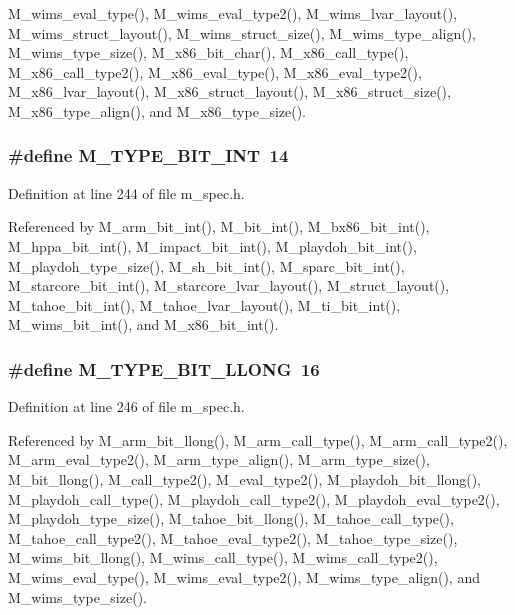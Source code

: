 M\_\-wims\_\-eval\_\-type(), M\_\-wims\_\-eval\_\-type2(), M\_\-wims\_\-lvar\_\-layout(), M\_\-wims\_\-struct\_\-layout(), M\_\-wims\_\-struct\_\-size(), M\_\-wims\_\-type\_\-align(), M\_\-wims\_\-type\_\-size(), M\_\-x86\_\-bit\_\-char(), M\_\-x86\_\-call\_\-type(), M\_\-x86\_\-call\_\-type2(), M\_\-x86\_\-eval\_\-type(), M\_\-x86\_\-eval\_\-type2(), M\_\-x86\_\-lvar\_\-layout(), M\_\-x86\_\-struct\_\-layout(), M\_\-x86\_\-struct\_\-size(), M\_\-x86\_\-type\_\-align(), and M\_\-x86\_\-type\_\-size().
\subsubsection{\setlength{\rightskip}{0pt plus 5cm}\#define M\_\-TYPE\_\-BIT\_\-INT~14}\label{m__spec_8h_432c3e10a97f13f2a41132bfd3a5602b}




Definition at line 244 of file m\_\-spec.h.

Referenced by M\_\-arm\_\-bit\_\-int(), M\_\-bit\_\-int(), M\_\-bx86\_\-bit\_\-int(), M\_\-hppa\_\-bit\_\-int(), M\_\-impact\_\-bit\_\-int(), M\_\-playdoh\_\-bit\_\-int(), M\_\-playdoh\_\-type\_\-size(), M\_\-sh\_\-bit\_\-int(), M\_\-sparc\_\-bit\_\-int(), M\_\-starcore\_\-bit\_\-int(), M\_\-starcore\_\-lvar\_\-layout(), M\_\-struct\_\-layout(), M\_\-tahoe\_\-bit\_\-int(), M\_\-tahoe\_\-lvar\_\-layout(), M\_\-ti\_\-bit\_\-int(), M\_\-wims\_\-bit\_\-int(), and M\_\-x86\_\-bit\_\-int().
\subsubsection{\setlength{\rightskip}{0pt plus 5cm}\#define M\_\-TYPE\_\-BIT\_\-LLONG~16}\label{m__spec_8h_f41d6eb55054b710299905e92f57ad57}




Definition at line 246 of file m\_\-spec.h.

Referenced by M\_\-arm\_\-bit\_\-llong(), M\_\-arm\_\-call\_\-type(), M\_\-arm\_\-call\_\-type2(), M\_\-arm\_\-eval\_\-type2(), M\_\-arm\_\-type\_\-align(), M\_\-arm\_\-type\_\-size(), M\_\-bit\_\-llong(), M\_\-call\_\-type2(), M\_\-eval\_\-type2(), M\_\-playdoh\_\-bit\_\-llong(), M\_\-playdoh\_\-call\_\-type(), M\_\-playdoh\_\-call\_\-type2(), M\_\-playdoh\_\-eval\_\-type2(), M\_\-playdoh\_\-type\_\-size(), M\_\-tahoe\_\-bit\_\-llong(), M\_\-tahoe\_\-call\_\-type(), M\_\-tahoe\_\-call\_\-type2(), M\_\-tahoe\_\-eval\_\-type2(), M\_\-tahoe\_\-type\_\-size(), M\_\-wims\_\-bit\_\-llong(), M\_\-wims\_\-call\_\-type(), M\_\-wims\_\-call\_\-type2(), M\_\-wims\_\-eval\_\-type(), M\_\-wims\_\-eval\_\-type2(), M\_\-wims\_\-type\_\-align(), and M\_\-wims\_\-type\_\-size().
